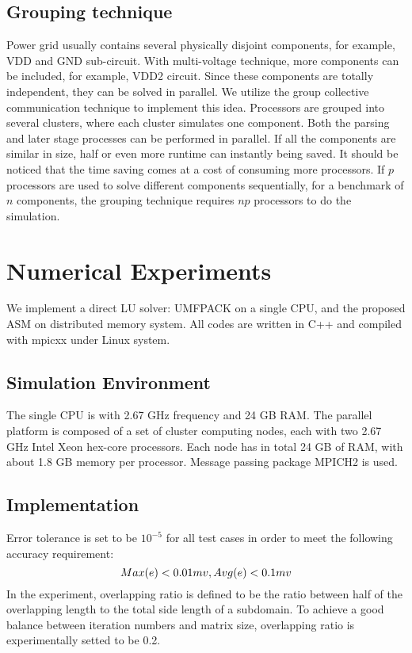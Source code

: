 \documentclass{sig-alternate}
\begin{document}
  \subsection{Grouping technique} 
	Power grid usually contains several physically disjoint components, for example, VDD and GND sub-circuit. With multi-voltage 
	technique, more components can be included, for example, VDD2 circuit. Since these components are totally independent, they can
	be solved in parallel. We utilize the group collective 
	communication technique to implement this idea. Processors are grouped into several clusters, where each cluster 
	simulates one component. Both the parsing and later stage processes can be performed in parallel. 
	If all the components are similar in size, half or even more runtime can instantly being saved. 
	It should be noticed that the time saving comes at a cost of consuming more processors. If $p$ processors are used to 
	solve different components sequentially, for a benchmark of $n$ components, the grouping technique requires $np$ processors to
	do the simulation.  
\section{Numerical Experiments}
	We implement a direct LU solver: UMFPACK on a single CPU, and the proposed ASM on distributed memory system. 
	All codes are written in C++ and compiled with mpicxx under Linux system. 
  \subsection{Simulation Environment}
	The single CPU is with 2.67 GHz frequency and 24 GB RAM. The parallel platform is composed of a set of cluster 
	computing nodes, each with two 2.67 GHz Intel Xeon hex-core processors. Each node has in total 24 GB of RAM, with about 
	1.8 GB memory per processor. Message passing package MPICH2 is used.  
  \subsection{Implementation}
	Error tolerance is set to be $10^{-5}$ for all test cases in order to meet the following accuracy requirement:
	\begin{equation}
		Max(e) < 0.01 mv, Avg(e) < 0.1 mv\\ \label{eq_err}
	\end{equation}
	In the experiment, overlapping ratio is defined to be the ratio between half of the overlapping length to the total side length of 
	a subdomain. To achieve a good balance between iteration numbers and matrix size, overlapping ratio is experimentally 
	setted to be 0.2.
			
\end{document}
